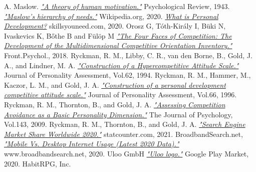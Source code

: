 \documentclass[twoside]{ctuthesis}
\begin{document}
    
    \begin{thebibliography}{99}
        A. Maslow.
        \href{http://psychclassics.yorku.ca/Maslow/motivation.htm}{\emph{"A theory of human motivation."}}
        Psychological Review, 1943.
        \href{https://en.wikipedia.org/wiki/File:Maslow's_Hierarchy_of_Needs2.svg}{\emph{"Maslow's hierarchy of needs."}}
        Wikipedia.org, 2020.
        \href{https://www.skillsyouneed.com/ps/personal-development.html}{\emph{What is Personal Development?}}
        skillsyouneed.com, 2020.
        Orosz G, Tóth-Király I, Büki N, Ivaskevics K, Bőthe B and Fülöp M
        \href{https://www.frontiersin.org/articles/10.3389/fpsyg.2018.00779/full}{\emph{"The Four Faces of Competition: The Development of the Multidimensional Competitive Orientation Inventory."}}
        Front.Psychol., 2018.
        Ryckman, R. M., Libby, C. R., van den Borne, B., Gold, J. A., and Lindner, M. A.
        \href{https://doi.org/10.1080/00223891.1990.9674097}{\emph{"Construction of a Hypercompetitive Attitude Scale."}}
        Journal of Personality Assessment, Vol.62, 1994.
        Ryckman, R. M., Hammer, M., Kaczor, L. M., and Gold, J. A.
        \href{https://doi.org/10.1207/s15327752jpa6602_15}{\emph{"Construction of a personal development competitive attitude scale."}}
        Journal of Personality Assessment, Vol.66, 1996.
         Ryckman, R. M., Thornton, B., and Gold, J. A.
        \href{https://doi.org/10.3200/JRLP.143.2.175-192}{\emph{"Assessing Competition Avoidance as a Basic Personality Dimension."}}
        The Journal of Psychology, Vol.143, 2009.
         Ryckman, R. M., Thornton, B., and Gold, J. A.
        \href{https://gs.statcounter.com/search-engine-market-share/all/worldwide/2020}{\emph{"Search Engine Market Share Worldwide 2020."}}
        statcounter.com, 2021.
        BroadbandSearch.net,
        \href{https://www.broadbandsearch.net/blog/mobile-desktop-internet-usage-statistics}{\emph{"Mobile Vs. Desktop Internet Usage (Latest 2020 Data)."}}
        www.broadbandsearch.net, 2020.
        Uloo GmbH
        \href{https://play.google.com/store/apps/details?id=com.uloo}{\emph{"Uloo logo."}}
        Google Play Market, 2020.
         HabitRPG, Inc.

\end{thebibliography}
\end{document}
